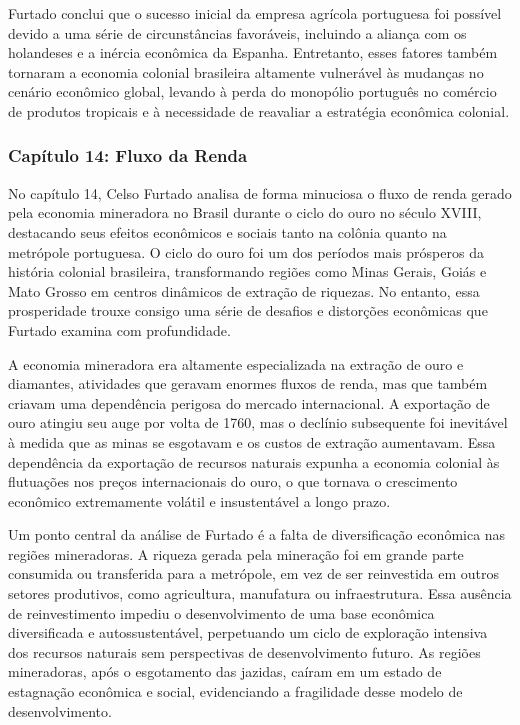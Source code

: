 \documentclass[a4paper,12pt]{article}[abntex2]
\begin{document}
Furtado conclui que o sucesso inicial da empresa agrícola portuguesa foi possível devido a uma série de circunstâncias favoráveis, incluindo a aliança com os holandeses e a inércia econômica da Espanha. Entretanto, esses fatores também tornaram a economia colonial brasileira altamente vulnerável às mudanças no cenário econômico global, levando à perda do monopólio português no comércio de produtos tropicais e à necessidade de reavaliar a estratégia econômica colonial.

\subsubsection{\textbf{Capítulo 14: Fluxo da Renda}}

No capítulo 14, Celso Furtado analisa de forma minuciosa o fluxo de renda gerado pela economia mineradora no Brasil durante o ciclo do ouro no século XVIII, destacando seus efeitos econômicos e sociais tanto na colônia quanto na metrópole portuguesa. O ciclo do ouro foi um dos períodos mais prósperos da história colonial brasileira, transformando regiões como Minas Gerais, Goiás e Mato Grosso em centros dinâmicos de extração de riquezas. No entanto, essa prosperidade trouxe consigo uma série de desafios e distorções econômicas que Furtado examina com profundidade.

A economia mineradora era altamente especializada na extração de ouro e diamantes, atividades que geravam enormes fluxos de renda, mas que também criavam uma dependência perigosa do mercado internacional. A exportação de ouro atingiu seu auge por volta de 1760, mas o declínio subsequente foi inevitável à medida que as minas se esgotavam e os custos de extração aumentavam. Essa dependência da exportação de recursos naturais expunha a economia colonial às flutuações nos preços internacionais do ouro, o que tornava o crescimento econômico extremamente volátil e insustentável a longo prazo.

Um ponto central da análise de Furtado é a falta de diversificação econômica nas regiões mineradoras. A riqueza gerada pela mineração foi em grande parte consumida ou transferida para a metrópole, em vez de ser reinvestida em outros setores produtivos, como agricultura, manufatura ou infraestrutura. Essa ausência de reinvestimento impediu o desenvolvimento de uma base econômica diversificada e autossustentável, perpetuando um ciclo de exploração intensiva dos recursos naturais sem perspectivas de desenvolvimento futuro. As regiões mineradoras, após o esgotamento das jazidas, caíram em um estado de estagnação econômica e social, evidenciando a fragilidade desse modelo de desenvolvimento.
\end{document}
